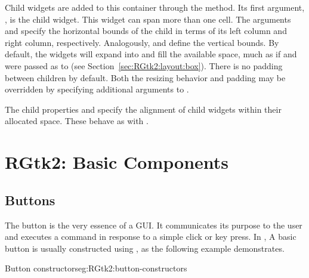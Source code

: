 Child widgets are added to this container through the
 method. Its first argument,
, is the child widget. This widget can
span more than one cell. The arguments
 and
 specify the horizontal bounds
of the child in terms of its left column and right column,
respectively. Analogously,  and
 define the vertical bounds.
By default, the widgets will expand into and fill the available space,
much as if  and
 were passed as  to
 (see
Section~\ref{sec:RGtk2:layout:box}). There is no padding between
children by default. Both the resizing behavior and padding may be
overridden by specifying additional arguments to
.

The child properties  and  specify the
alignment of child widgets within their allocated space. These behave
as with .



\chapter{RGtk2: Basic Components}
\label{sec:basic-components}


\section{Buttons}
\label{sec:RGtk2:gtkButton}

The button is the very essence of a GUI. It communicates its purpose
to the user and executes a command in response to a simple click or
key press. In \GTK\/, A basic button is usually constructed using
, as the following example demonstrates.

\begin{example}{Button constructors}{eg:RGtk2:button-constructors}
\begin{Schunk}
\end{Schunk}
\end{example}

